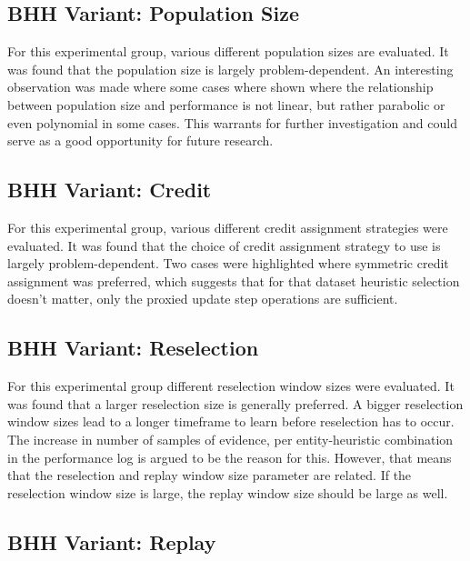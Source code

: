 \subsection{\ac{BHH} Variant: Population Size}
\label{sec:conclusion:results:summary:population_size}

For this experimental group, various different population sizes are evaluated. It was found that the population size is largely problem-dependent. An interesting observation was made where some cases where shown where the relationship between population size and performance is not linear, but rather parabolic or even polynomial in some cases. This warrants for further investigation and could serve as a good opportunity for future research.

\subsection{\ac{BHH} Variant: Credit}
\label{sec:conclusion:results:summary:credit}

For this experimental group, various different credit assignment strategies were evaluated. It was found that the choice of credit assignment strategy to use is largely problem-dependent. Two cases were highlighted where symmetric credit assignment was preferred, which suggests that for that dataset heuristic selection doesn't matter, only the proxied update step operations are sufficient.

\subsection{\ac{BHH} Variant: Reselection}
\label{sec:conclusion:results:summary:reselection}

For this experimental group different reselection window sizes were evaluated. It was found that a larger reselection size is generally preferred. A bigger reselection window sizes lead to a longer timeframe to learn before reselection has to occur. The increase in number of samples of evidence, per entity-heuristic combination in the performance log is argued to be the reason for this. However, that means that the reselection and replay window size parameter are related. If the reselection window size is large, the replay window size should be large as well.

\subsection{\ac{BHH} Variant: Replay}
\label{sec:conclusion:results:summary:replay}

